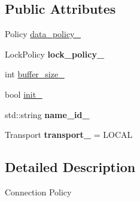 \subsection*{Public Attributes}
\begin{DoxyCompactItemize}
\item 
Policy \hyperlink{structcoco_1_1_connection_policy_aa37517fcc9cd9bfd6d3922023b16a488}{data\-\_\-policy\-\_\-}
\item 
\hypertarget{structcoco_1_1_connection_policy_acaa6623737829cb63001a7266795dfcd}{Lock\-Policy {\bfseries lock\-\_\-policy\-\_\-}}\label{structcoco_1_1_connection_policy_acaa6623737829cb63001a7266795dfcd}

\item 
int \hyperlink{structcoco_1_1_connection_policy_a481122e34e02c0bce981ea65c2a10b0c}{buffer\-\_\-size\-\_\-}
\item 
bool \hyperlink{structcoco_1_1_connection_policy_a359054d26257b4e074d69b943d8453e8}{init\-\_\-}
\item 
\hypertarget{structcoco_1_1_connection_policy_a1ff94843c53e3abc8c246cbb16dc72d3}{std\-::string {\bfseries name\-\_\-id\-\_\-}}\label{structcoco_1_1_connection_policy_a1ff94843c53e3abc8c246cbb16dc72d3}

\item 
\hypertarget{structcoco_1_1_connection_policy_ac33574e0a7670ea03848d34726e67728}{Transport {\bfseries transport\-\_\-} = L\-O\-C\-A\-L}\label{structcoco_1_1_connection_policy_ac33574e0a7670ea03848d34726e67728}

\end{DoxyCompactItemize}


\subsection{Detailed Description}
Connection Policy 

